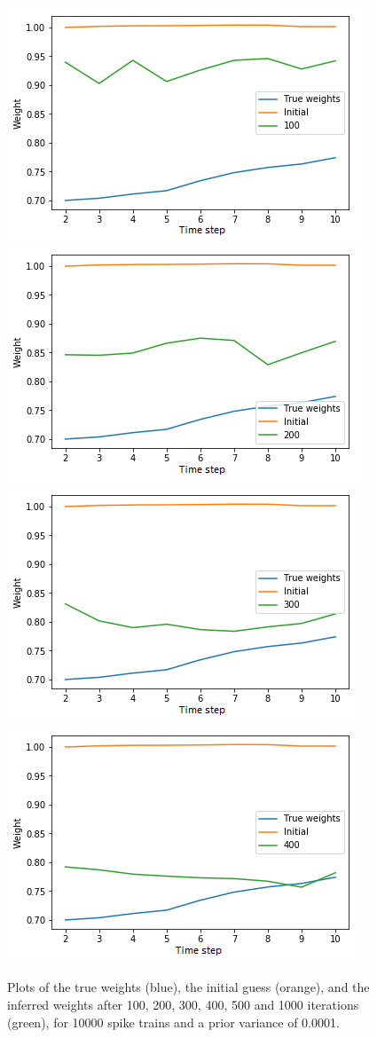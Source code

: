 \begin{figure}[P]
\caption{Plots of the true weights (blue), the initial guess (orange), and the inferred weights after 100, 200, 300, 400, 500 and 1000 iterations (green), for 10000 spike trains and a prior variance of 0.0001.}
\label{fig:trajectories}
    \centering
    \includegraphics[scale=0.5]{fig/10000_100_wa.png}
    \includegraphics[scale = 0.5]{fig/10000_200_wa.png}\\
    \includegraphics[scale = 0.5]{fig/10000_300_wa.png}
    \includegraphics[scale = 0.5]{fig/10000_400_wa.png}\\

\end{figure}
